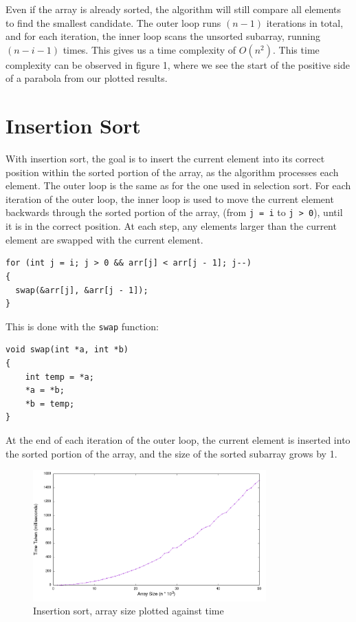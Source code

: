 \documentclass[a4paper,11pt]{article}
\begin{document}
Even if the array is already sorted, the algorithm will still compare all elements to find the smallest candidate.
The outer loop runs $(n - 1)$ iterations in total, and for each iteration, the inner loop scans the unsorted subarray,
running $(n - i - 1)$ times.
This gives us a time complexity of $O(n^2)$.
This time complexity can be observed in figure 1, where we see the start of the positive side of a parabola from our plotted results.

\section*{Insertion Sort}
With insertion sort, the goal is to insert the current element into its correct position within the sorted portion of the array,
as the algorithm processes each element.
The outer loop is the same as for the one used in selection sort.
For each iteration of the outer loop, the inner loop is used to move the current element backwards through the sorted portion of the array,
(from \texttt{j = i} to \texttt{j > 0}), until it is in the correct position.
At each step, any elements larger than the current element are swapped with the current element.

\begin{verbatim}
for (int j = i; j > 0 && arr[j] < arr[j - 1]; j--)
{
  swap(&arr[j], &arr[j - 1]);
}
\end{verbatim}

This is done with the \texttt{swap} function:

\begin{verbatim}
void swap(int *a, int *b)
{
    int temp = *a;
    *a = *b;
    *b = temp;
}
\end{verbatim}

At the end of each iteration of the outer loop, the current element is inserted into the sorted portion of the array,
and the size of the sorted subarray grows by 1.

\begin{figure}[h!]
  \centering
  \includegraphics[width=0.8\textwidth]{InsertionSort_plot}
  \caption{Insertion sort, array size plotted against time}
  \label{fig:InsertionSort_plot}
\end{figure}
\end{document}
